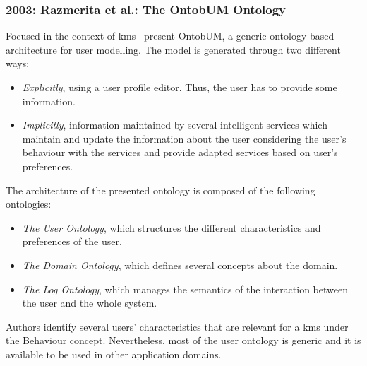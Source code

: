 \subsubsection{2003: Razmerita et al.: The OntobUM Ontology}
\label{sec:razmerita2003ontology}

Focused in the context of \ac{kms}~\citet{razmerita_ontology_based_2003} present
OntobUM, a generic ontology-based architecture for user modelling. The model is 
generated through two different ways:

\begin{itemize}
  \item \textit{Explicitly}, using a user profile editor. Thus, the user has to 
  provide some information.
  \item \textit{Implicitly}, information maintained by several intelligent 
  services which maintain and update the information about the user considering 
  the user's behaviour with the services and provide adapted services based on 
  user's preferences.
\end{itemize}

The architecture of the presented ontology is composed of the following ontologies:

\begin{itemize}
  \item \textit{The User Ontology}, which structures the different characteristics
  and preferences of the user.
  \item \textit{The Domain Ontology}, which defines several concepts about the
  domain.
  \item \textit{The Log Ontology}, which manages the semantics of the interaction 
  between the user and the whole system.
\end{itemize}

Authors identify several users' characteristics that are relevant for a \ac{kms} 
under the Behaviour concept. Nevertheless, most of the user ontology is 
generic and it is available to be used in other application domains. 

